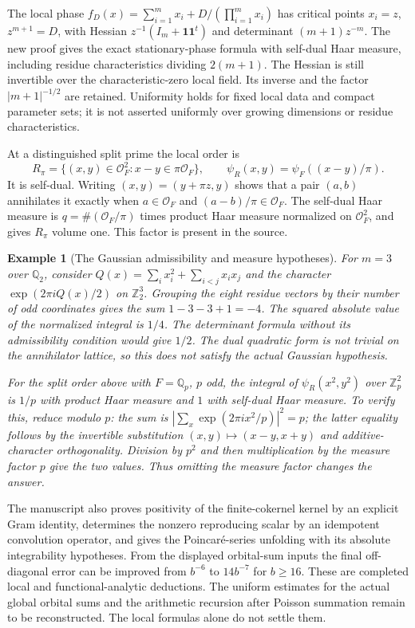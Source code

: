 \documentclass[11pt,a4paper]{article}
\newtheorem{example}[proposition]{Example}
\theoremstyle{remark}
\newcommand{\Z}{\mathbb Z}
\newcommand{\Q}{\mathbb Q}
\newcommand{\OO}{\mathcal O}
\begin{document}
The local phase
$f_D(x)=\sum_{i=1}^m x_i+D/(\prod_{i=1}^m x_i)$ has critical
points $x_i=z$, $z^{m+1}=D$, with Hessian
$z^{-1}(I_m+\mathbf1\mathbf1^t)$ and determinant
$(m+1)z^{-m}$. The new proof gives the exact stationary-phase
formula with self-dual Haar measure, including residue
characteristics dividing $2(m+1)$. The Hessian is still
invertible over the characteristic-zero local field. Its inverse
and the factor $|m+1|^{-1/2}$ are retained. Uniformity holds for
fixed local data and compact parameter sets; it is not asserted
uniformly over growing dimensions or residue characteristics.

At a distinguished split prime the local order is
\[
 R_\pi=\{(x,y)\in\OO_F^2:x-y\in\pi\OO_F\},\qquad
 \psi_R(x,y)=\psi_F((x-y)/\pi).
\]
It is self-dual. Writing $(x,y)=(y+\pi z,y)$ shows that a
pair $(a,b)$ annihilates it exactly when $a\in\OO_F$ and
$(a-b)/\pi\in\OO_F$. The self-dual Haar measure is
$q=\#(\OO_F/\pi)$ times product Haar measure normalized on
$\OO_F^2$, and gives $R_\pi$ volume one. This factor is
present in the source.

\begin{example}[The Gaussian admissibility and measure hypotheses]
For $m=3$ over $\Q_2$, consider
$Q(x)=\sum_i x_i^2+\sum_{i<j}x_ix_j$ and the character
$\exp(2\pi iQ(x)/2)$ on $\Z_2^3$.
Grouping the eight residue vectors by their number of odd
coordinates gives the sum $1-3-3+1=-4$.
The squared absolute value of the normalized integral is
$1/4$. The determinant formula without its admissibility
condition would give $1/2$. The dual quadratic form is not
trivial on the annihilator lattice, so this does not satisfy
the actual Gaussian hypothesis.

For the split order above with $F=\Q_p$, $p$ odd, the integral
of $\psi_R(x^2,y^2)$ over $\Z_p^2$ is $1/p$ with product
Haar measure and $1$ with self-dual Haar measure. To verify
this, reduce modulo $p$: the sum is
$|\sum_x\exp(2\pi i x^2/p)|^2=p$; the latter equality
follows by the invertible substitution $(x,y)\mapsto(x-y,x+y)$
and additive-character orthogonality. Division by $p^2$ and
then multiplication by the measure factor $p$ give the two
values. Thus omitting the measure factor changes the answer.
\end{example}

The manuscript also proves positivity of the finite-cokernel
kernel by an explicit Gram identity, determines the nonzero
reproducing scalar by an idempotent convolution operator, and
gives the Poincar\'e-series unfolding with its absolute
integrability hypotheses. From the displayed orbital-sum inputs
the final off-diagonal error can be improved from $b^{-6}$ to
$14b^{-7}$ for $b\ge16$. These are completed local and
functional-analytic deductions. The uniform estimates for the
actual global orbital sums and the arithmetic recursion after Poisson summation
remain to be reconstructed. The local formulas alone do not
settle them.
\end{document}
